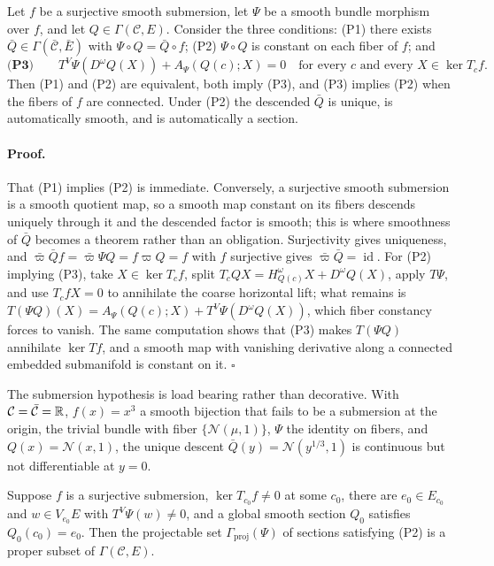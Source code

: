 Let $f$ be a surjective smooth submersion, let $\Psi$ be a smooth bundle
morphism over $f$, and let $Q\in\Gamma(\mathcal C,E)$.  Consider the three
conditions: (P1) there exists $\bar Q\in\Gamma(\bar{\mathcal C},\bar E)$ with
$\Psi\circ Q=\bar Q\circ f$; (P2) $\Psi\circ Q$ is constant on each fiber of
$f$; and
\begin{equation}
\textbf{(P3)}\qquad
T^V\Psi\left(D^\omega Q(X)\right)+A_\Psi\left(Q(c);X\right)=0
\quad\text{for every }c\text{ and every }X\in\ker T_cf.
\label{eq:pb-projectability-criterion}
\end{equation}
Then (P1) and (P2) are equivalent, both imply (P3), and (P3) implies (P2) when
the fibers of $f$ are connected.  Under (P2) the descended $\bar Q$ is unique,
is automatically smooth, and is automatically a section.  

\paragraph{Proof.}
That (P1) implies (P2) is immediate.  Conversely, a surjective smooth
submersion is a smooth quotient map, so a smooth map constant on its fibers
descends uniquely through it and the descended factor is smooth; this is where
smoothness of $\bar Q$ becomes a theorem rather than an obligation.
Surjectivity gives uniqueness, and
$\bar\varpi\bar Qf=\bar\varpi\Psi Q=f\varpi Q=f$ with $f$ surjective gives
$\bar\varpi\bar Q=\operatorname{id}$.  For (P2) implying (P3), take
$X\in\ker T_cf$, split $T_cQX=H^\omega_{Q(c)}X+D^\omega Q(X)$, apply $T\Psi$,
and use $T_cfX=0$ to annihilate the coarse horizontal lift; what remains is
$T(\Psi Q)(X)=A_\Psi(Q(c);X)+T^V\Psi(D^\omega Q(X))$, which fiber constancy
forces to vanish.  The same computation shows that (P3) makes $T(\Psi Q)$
annihilate $\ker Tf$, and a smooth map with vanishing derivative along a
connected embedded submanifold is constant on it.  $\square$

The submersion hypothesis is load bearing rather than decorative.  With
$\mathcal C=\bar{\mathcal C}=\mathbb R$, $f(x)=x^3$ a smooth bijection that fails to be
a submersion at the origin, the trivial bundle with fiber
$\{\mathcal N(\mu,1)\}$, $\Psi$ the identity on fibers, and
$Q(x)=\mathcal N(x,1)$, the unique descent $\bar Q(y)=\mathcal N(y^{1/3},1)$ is
continuous but not differentiable at $y=0$.  

Suppose $f$ is a surjective submersion, $\ker T_{c_0}f\ne0$ at some $c_0$,
there are $e_0\in E_{c_0}$ and $w\in V_{e_0}E$ with
$T^V\Psi(w)\ne0$, and a global smooth section $Q_0$ satisfies
$Q_0(c_0)=e_0$.  Then the projectable set
$\Gamma_{\mathrm{proj}}(\Psi)$ of sections satisfying (P2) is a proper subset
of $\Gamma(\mathcal C,E)$.  

